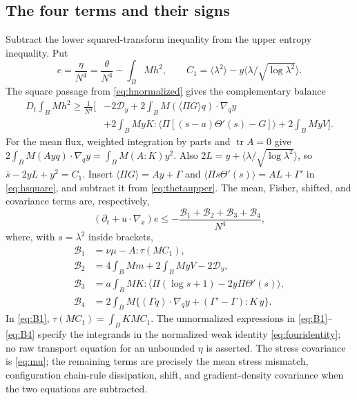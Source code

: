 \documentclass[11pt]{article}
\numberwithin{equation}{section}
\newcommand{\tr}{\operatorname{tr}}
\newcommand{\grad}{\nabla}
\newcommand{\Dy}{\mathcal D_y}
\newcommand{\pair}[1]{\langle #1\rangle}
\begin{document}
\subsection{The four terms and their signs}\label{subsec:four}
Subtract the lower squared-transform inequality from the upper entropy
inequality. Put
\begin{equation}\label{eq:e}
 e=\frac\eta{N^4}=\frac\theta{N^4}-\int_BMh^2,\qquad
 C_1=\pair{\lambda^2}-y\pair{\lambda/\sqrt{\log\lambda^2}}.
\end{equation}
The square passage from \eqref{eq:hnormalized} gives the complementary balance
\begin{equation}\label{eq:hsquare}
\begin{aligned}
 D_t\int_BMh^2\geq\frac1{N^4}\biggl[
 &-2\Dy+2\int_BM(\pair{\Pi G}q)\cdot\grad_qy\\
 &+2\int_BMyK:\pair{\Pi[(s-a)\Theta'(s)-G]}
   +2\int_BMyV\biggr].
\end{aligned}
\end{equation}
For the mean flux, weighted integration by parts and $\tr A=0$ give
$2\int_BM(Ayq)\cdot\grad_qy=\int_BM(A:K)y^2$.
Also $2L=y+\pair{\lambda/\sqrt{\log\lambda^2}}$, so
$\overline s-2yL+y^2=C_1$.
Insert $\pair{\Pi G}=Ay+\Gamma$ and
$\pair{\Pi s\Theta'(s)}=AL+\Gamma'$ in \eqref{eq:hsquare}, and subtract it
from \eqref{eq:thetaupper}. The mean, Fisher, shifted, and covariance terms
are, respectively,
\begin{equation}\label{eq:fouridentity}
 (\partial_t+u\cdot\grad_x)e\leq
       -\frac{\mathcal B_1+\mathcal B_2+\mathcal B_3+\mathcal B_4}{N^4},
\end{equation}
where, with $s=\lambda^2$ inside brackets,
\begin{align}
 \mathcal B_1&=\nu\mu-A:\tau(MC_1),\label{eq:B1}\\
 \mathcal B_2&=4\int_BMm+2\int_BMyV-2\Dy,\label{eq:B2}\\
 \mathcal B_3&=a\int_BMK:
       \pair{\Pi(\log s+1)-2y\Pi\Theta'(s)},\label{eq:B3}\\
 \mathcal B_4&=2\int_BM\{(\Gamma q)\cdot\grad_qy
                               +(\Gamma'-\Gamma):K\,y\}.\label{eq:B4}
\end{align}
In \eqref{eq:B1}, $\tau(MC_1)=\int_BKMC_1$.
The unnormalized expressions in \eqref{eq:B1}--\eqref{eq:B4} specify the
integrands in the normalized weak identity \eqref{eq:fouridentity}; no raw
transport equation for an unbounded $\eta$ is asserted.
The stress covariance is \eqref{eq:mu}; the remaining terms are precisely the
mean stress mismatch, configuration chain-rule dissipation, shift, and
gradient-density covariance when the two equations are subtracted.
\end{document}
